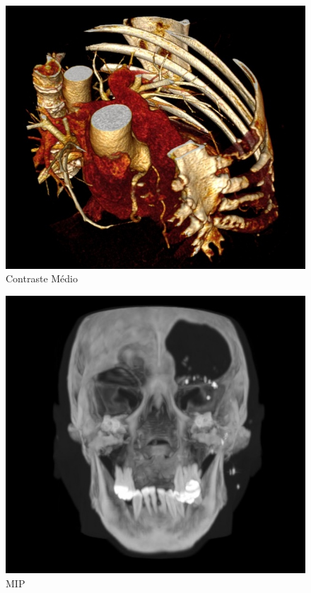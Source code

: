 \begin{figure}[!htb]
\centering
\includegraphics[scale=0.42]{../user_guide_figures/invesalius_screen/contraste_medio.jpg}
\caption{Contraste Médio}
\label{fig:contraste_medio}
\end{figure}

\begin{figure}[!htb]
\centering
\includegraphics[scale=0.55]{../user_guide_figures/invesalius_screen/MIP.jpg}
\caption{MIP}
\label{fig:MIP}
\end{figure}


